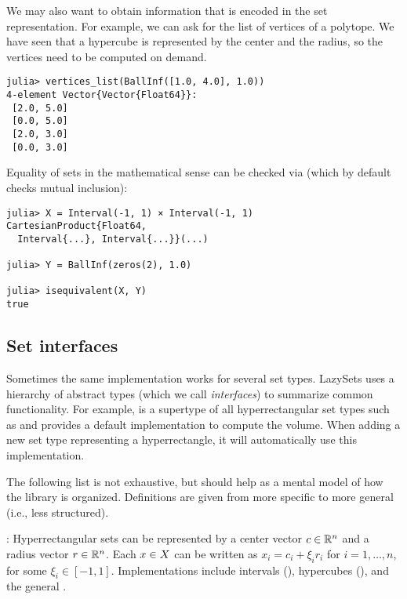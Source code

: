 We may also want to obtain information that is encoded in the set representation.
For example, we can ask for the list of vertices of a polytope.
We have seen that a hypercube is represented by the center and the radius, so the vertices need to be computed on demand.

\begin{minipage}{\linewidth}
\begin{lstlisting}
julia> vertices_list(BallInf([1.0, 4.0], 1.0))
4-element Vector{Vector{Float64}}:
 [2.0, 5.0]
 [0.0, 5.0]
 [2.0, 3.0]
 [0.0, 3.0]
\end{lstlisting}
\end{minipage}

Equality of sets in the mathematical sense can be checked via  (which by default checks mutual inclusion):

\begin{minipage}{\linewidth}
	\begin{lstlisting}
julia> X = Interval(-1, 1) × Interval(-1, 1)
CartesianProduct{Float64,
  Interval{...}, Interval{...}}(...)

julia> Y = BallInf(zeros(2), 1.0)

julia> isequivalent(X, Y)
true
\end{lstlisting}
\end{minipage}


\subsection{Set interfaces}

Sometimes the same implementation works for several set types.
LazySets uses a hierarchy of abstract types (which we call \emph{interfaces}) to summarize common functionality.
For example,  is a supertype of all hyperrectangular set types such as  and provides a default implementation to compute the volume.
When adding a new set type representing a hyperrectangle, it will automatically use this implementation.

The following list is not exhaustive, but should help as a mental model of how the library is organized. Definitions are given from more specific to more general (i.e., less structured).

\smallskip

: Hyperrectangular sets can be represented by a center vector $c \in \mathbb{R}^n$ and a radius vector $r \in \mathbb{R}^n$. Each $x \in X$ can be written as $x_i = c_i + \xi_i r_i$ for $i = 1,\ldots, n$, for some $\xi_i \in [-1, 1]$. Implementations include intervals (), hypercubes (), and the general .

